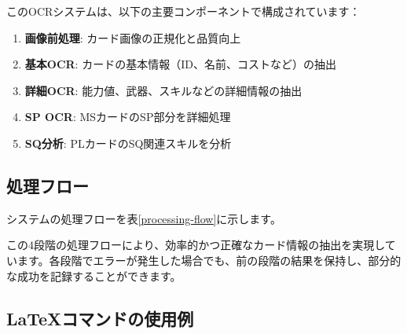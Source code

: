 \documentclass[a4paper,11pt]{jsarticle}
\begin{document}
このOCRシステムは、以下の主要コンポーネントで構成されています：

\begin{enumerate}
    \item \textbf{画像前処理}: カード画像の正規化と品質向上
    \item \textbf{基本OCR}: カードの基本情報（ID、名前、コストなど）の抽出
    \item \textbf{詳細OCR}: 能力値、武器、スキルなどの詳細情報の抽出
    \item \textbf{SP OCR}: MSカードのSP部分を詳細処理
    \item \textbf{SQ分析}: PLカードのSQ関連スキルを分析
\end{enumerate}

\subsection*{処理フロー}

システムの処理フローを表\ref{processing-flow}に示します。

\begin{table}[htb]
  \caption{OCRシステム処理フロー}
  \label{processing-flow}
  \begin{center}
    \end{center}
\end{table}

この4段階の処理フローにより、効率的かつ正確なカード情報の抽出を実現しています。各段階でエラーが発生した場合でも、前の段階の結果を保持し、部分的な成功を記録することができます。

\subsection*{LaTeXコマンドの使用例}
\end{document}
